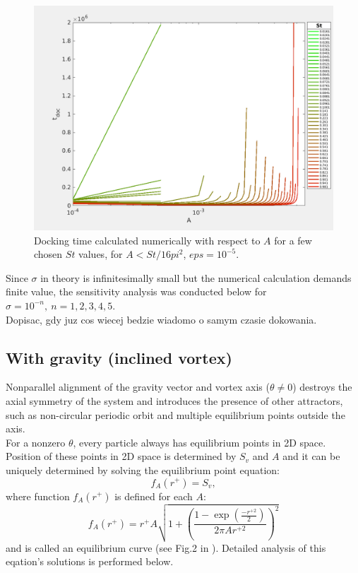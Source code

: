 \documentclass[../main.tex]{subfiles}
\begin{document}
\begin{figure}
\centering
\noindent \includegraphics[width=30pc]{gfx/A_t_doc_St_part_left_logflat_eps000001.png}
\caption{Docking time calculated numerically with respect to $A$ for a few chosen $St$ values, for $A<St/16pi^2$, $eps=10^{-5}$.}
\label{fig:ch3_5b}
\end{figure}

Since $\sigma$ in theory is infinitesimally small but the numerical calculation demands finite value, the sensitivity analysis was conducted below for $\sigma=10^{-n}, \ n=1,2,3,4,5$.\\
Dopisac, gdy juz cos wiecej bedzie wiadomo o samym czasie dokowania.


\subsection{With gravity (inclined vortex)}
\noindent Nonparallel alignment of the gravity vector and vortex axis ($\theta \neq 0$) destroys the axial symmetry of the system and introduces the presence of other attractors, such as non-circular periodic orbit and multiple equilibrium points outside the axis.\\
 
For a nonzero $\theta$, every particle always has equilibrium points in 2D space. Position of these points in 2D space is determined by $S_v$ and $A$ and it can be uniquely determined by solving the equilibrium point equation:
\begin{equation}
 f_A(r^+) = S_v,
 \label{ch3:eq27}
\end{equation}
where function $f_A(r^+)$ is defined for each $A$:
\begin{equation}
f_A(r^+) = r^+ A \sqrt { 1 + \left( \frac{1-\exp \left(\frac{-r^{+ 2}}{2}\right)}{2\pi Ar^{+ 2}} \right)^2 }
 \label{ch3:eq28}
\end{equation}
and is called an equilibrium curve (see Fig.2 in \citet{Marcu1995}). Detailed analysis of this eqation's solutions is performed below.\\
\end{document}
